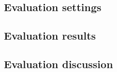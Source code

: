 \subsection{Evaluation settings}

\subsection{Evaluation results}

\subsection{Evaluation discussion}